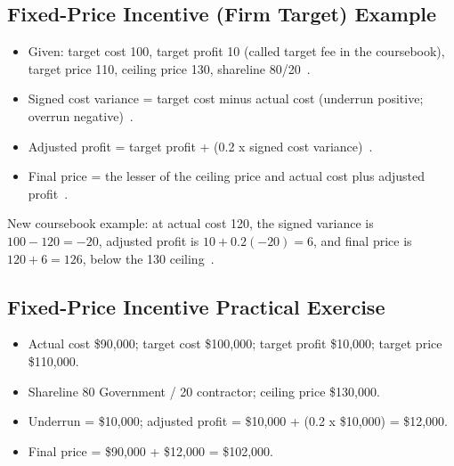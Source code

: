 \documentclass[../main.tex]{subfiles}
\begin{document}
\subsection{Fixed-Price Incentive (Firm Target) Example}
\begin{itemize}
  \item Given: target cost 100, target profit 10 (called target fee in the coursebook), target price 110, ceiling price 130, shareline 80/20~\autocite{edo-3-2-2-solicitation-prep-2025}.
  \item Signed cost variance = target cost minus actual cost (underrun positive; overrun negative)~\autocite{edo-3-2-2-solicitation-prep-2025}.
  \item Adjusted profit = target profit + (0.2 x signed cost variance)~\autocite{edo-3-2-2-solicitation-prep-2025}.
  \item Final price = the lesser of the ceiling price and actual cost plus adjusted profit~\autocite{edo-3-2-2-solicitation-prep-2025}.
\end{itemize}

\noindent New coursebook example: at actual cost 120, the signed variance is $100-120=-20$, adjusted profit is $10+0.2(-20)=6$, and final price is $120+6=126$, below the 130 ceiling~\autocite{edo-3-2-2-solicitation-prep-2025,FAR-16-403-1-FPIF}.

\subsection{Fixed-Price Incentive Practical Exercise}
\begin{itemize}
  \item Actual cost \$90,000; target cost \$100,000; target profit \$10,000; target price \$110,000.
  \item Shareline 80 Government / 20 contractor; ceiling price \$130,000.
  \item Underrun = \$10,000; adjusted profit = \$10,000 + (0.2 x \$10,000) = \$12,000.
  \item Final price = \$90,000 + \$12,000 = \$102,000.
\end{itemize}
~\autocite{edo-3-2-2-solicitation-prep-2025}
\end{document}
